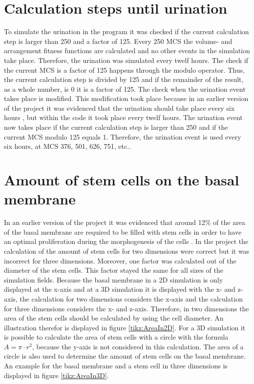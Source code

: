 \section{Calculation steps until urination}\label{sec:calculationStpesUntilUrination}
To simulate the urination in the program it was checked if the current calculation step is larger than 250 and a factor of 125. Every 250 \ac{MCS} the volume- and arrangement fitness functions are calculated and no other events in the simulation take place. Therefore, the urination was simulated every twelf hours. The check if the current \ac{MCS} is a factor of 125 happens through the modulo operator. Thus, the current calculation step is divided by 125 and if the remainder of the result, as a whole number, is 0 it is a factor of 125. \newline
The check when the urination event takes place is modified. This modification took place because in an earlier version of the project it was evidenced that the urination should take place every six hours \cite{Torelli2017}, but within the code it took place every twelf hours. The urination event now takes place if the current calculation step is larger than 250 and if the current \ac{MCS} modulo 125 equals 1. Therefore, the urination event is used every six hours, at \ac{MCS} 376, 501, 626, 751, etc.. 

\section{Amount of stem cells on the basal membrane}\label{sec:AmountStemCellsBasalMembrane}
In an earlier version of the project it was evidenced that around 12\% of the area of the basal membrane are required to be filled with stem cells in order to have an optimal proliferation during the morphogenesis of the cells \cite{Torelli2017}.
In the project the calculation of the amount of stem cells for two dimensions were correct but it was incorrect for three dimensions. Moreover, one factor was calculated out of the diameter of the stem cells. This factor stayed the same for all sizes of the simulation fields. \newline
Because the basal membrane in a 2D simulation is only displayed at the x-axis and at a 3D simulation it is displayed with the x- and z-axis, the calculation for two dimensions considers the x-axis and the calculation for three dimensions considers the x- and z-axis. Therefore, in two dimensions the area of the stem cells should be calculated by using the cell diameter. An illustration therefor is displayed in figure \ref{tikz:AreaIn2D}. For a 3D simulation it is possible to calculate the area of stem cells with a circle with the formula $A = \pi \cdot r^{2}$, because the y-axis is not considered in this calculation. The area of a circle is also used to determine the amount of stem cells on the basal membrane. An example for the basal membrane and a stem cell in three dimensions is displayed in figure \ref{tikz:AreaIn3D}. 

